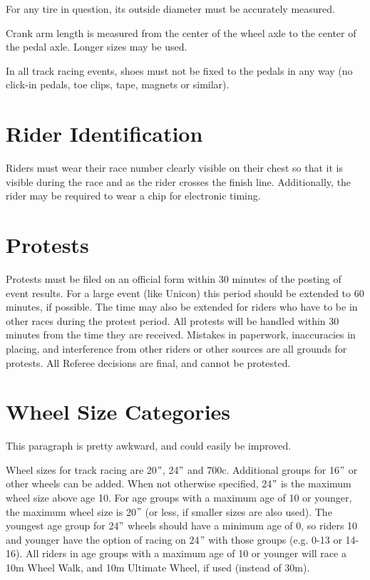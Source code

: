 For any tire in question, its outside diameter must be accurately measured.

Crank arm length is measured from the center of the wheel axle to the center of the pedal axle. Longer sizes may be used.

In all track racing events, shoes must not be fixed to the pedals in any way (no click-in pedals, toe clips, tape, magnets or similar).%

\section{Rider Identification}

Riders must wear their race number clearly visible on their chest so that it is visible during the race and as the rider crosses the finish line.
Additionally, the rider may be required to wear a chip for electronic timing.

\section{Protests}

Protests must be filed on an official form within 30 minutes of the posting of event results.
For a large event (like Unicon) this period should be extended to 60 minutes, if possible.
The time may also be extended for riders who have to be in other races during the protest period.
All protests will be handled within 30 minutes from the time they are received.
Mistakes in paperwork, inaccuracies in placing, and interference from other riders or other sources are all grounds for protests.
All Referee decisions are final, and cannot be protested.

\section{Wheel Size Categories}

\begin{comment-2016}
This paragraph is pretty awkward, and could easily be improved.
\end{comment-2016}

Wheel sizes for track racing are 20$"$, 24$"$ and 700c.
Additional groups for 16$"$ or other wheels can be added.
When not otherwise specified, 24$"$ is the maximum wheel size above age 10.
For age groups with a maximum age of 10 or younger, the maximum wheel size is 20$"$ (or less, if smaller sizes are also used).
The youngest age group for 24$"$ wheels should have a minimum age of 0, so riders 10 and younger have the option of racing on 24$"$ with those groups (e.g. 0-13 or 14-16).
All riders in age groups with a maximum age of 10 or younger will race a 10m Wheel Walk, and 10m Ultimate Wheel, if used (instead of 30m).

